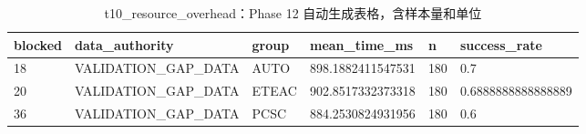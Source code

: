 \begin{table}[htbp]
\centering
\caption{t10_resource_overhead：Phase 12 自动生成表格，含样本量和单位}
\begin{tabular}{llllll}
\hline
blocked & data_authority & group & mean_time_ms & n & success_rate \\
\hline
18 & VALIDATION\_GAP\_DATA & AUTO & 898.1882411547531 & 180 & 0.7 \\
20 & VALIDATION\_GAP\_DATA & ETEAC & 902.8517332373318 & 180 & 0.6888888888888889 \\
36 & VALIDATION\_GAP\_DATA & PCSC & 884.2530824931956 & 180 & 0.6 \\
\hline
\end{tabular}
\end{table}
